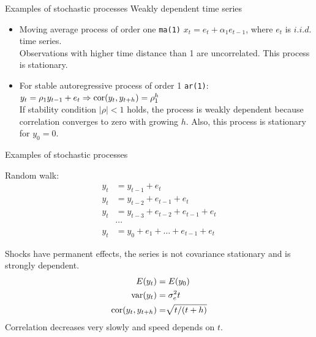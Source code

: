 \documentclass{beamer}
\begin{document}
\begin{frame}{Examples of stochastic processes}
Weakly dependent time series
  \vspace{0.4cm}
\begin{itemize}
  \item Moving average process of order one \texttt{ma(1)} $x_t=e_t+\alpha_1 e_{t-1}$, where $e_t$ is $\textit{i.i.d.}$ time series. \\Observations with higher time distance than 1 are uncorrelated. This process is stationary.
  \vspace{0.7cm}
  \item For stable autoregressive process of order 1 \texttt{ar(1)}: \\ \smallskip
  $y_t = \rho_1 y_{t-1} + e_t \Rightarrow \textnormal{cor}(y_t,y_{t+h})=\rho^h_1$\\
  \vspace{0.4cm}
  If stability condition $|\rho|<1$  holds, the process is weakly dependent because correlation converges to zero with growing $h$. Also, this process is stationary for $y_0 =0$.
  \vspace{0.4cm}
\end{itemize}

\end{frame}


\begin{frame}{Examples of stochastic processes}

Random walk:  
\begin{align}\nonumber
y_t &= y_{t-1}+e_t \\\nonumber 
y_t &= y_{t-2}+e_{t-1}+e_t \\\nonumber
y_t &= y_{t-3}+e_{t-2}+e_{t-1}+e_t \\\nonumber
& \cdots \\ \nonumber
y_t &= y_0 + e_1 + \dots +e_{t-1} + e_t
\end{align} 

Shocks have permanent effects, the series is not covariance stationary and is strongly dependent.
\begin{align}\nonumber
E(y_t) & =E(y_0) \\\nonumber
\textnormal{var}(y_t) & =\sigma^2_e t \\\nonumber
\textnormal{cor}(y_t,y_{t+h}) & =\sqrt[]{t/(t+h)}
\end{align} 
Correlation decreases very slowly and speed depends on $t$.

\end{frame}
\end{document}
